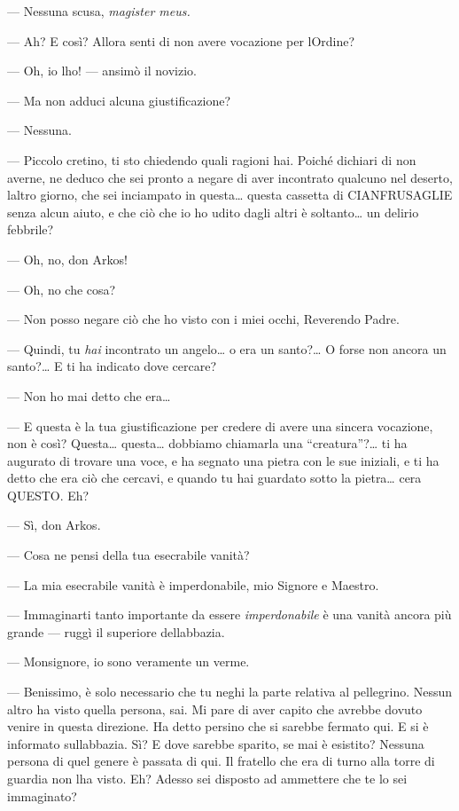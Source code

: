 --- Nessuna scusa, \emph{magister meus.}

--- Ah? E così? Allora senti di non avere vocazione per
l\textquotesingle Ordine?

--- Oh, io l\textquotesingle ho! --- ansimò il novizio.

--- Ma non adduci alcuna giustificazione?

--- Nessuna.

--- Piccolo cretino, ti sto chiedendo quali ragioni hai. Poiché dichiari
di non averne, ne deduco che sei pronto a negare di aver incontrato
qualcuno nel deserto, l\textquotesingle altro giorno, che sei inciampato
in questa\ldots{} questa cassetta di CIANFRUSAGLIE senza alcun aiuto, e
che ciò che io ho udito dagli altri è soltanto\ldots{} un delirio
febbrile?

--- Oh, no, don Arkos!

--- Oh, no che cosa?

--- Non posso negare ciò che ho visto con i miei occhi, Reverendo Padre.

--- Quindi, tu \emph{hai} incontrato un angelo\ldots{} o era un
santo?\ldots{} O forse non ancora un santo?\ldots{} E ti ha indicato
dove cercare?

--- Non ho mai detto che era\ldots{}

--- E questa è la tua giustificazione per credere di avere una sincera
vocazione, non è così? Questa\ldots{} questa\ldots{} dobbiamo chiamarla
una ``creatura''?\ldots{} ti ha augurato di trovare una voce, e ha
segnato una pietra con le sue iniziali, e ti ha detto che era ciò che
cercavi, e quando tu hai guardato sotto la pietra\ldots{}
c\textquotesingle era QUESTO. Eh?

--- Sì, don Arkos.

--- Cosa ne pensi della tua esecrabile vanità?

--- La mia esecrabile vanità è imperdonabile, mio Signore e Maestro.

--- Immaginarti tanto importante da essere \emph{imperdonabile} è una
vanità ancora più grande --- ruggì il superiore
dell\textquotesingle abbazia.

--- Monsignore, io sono veramente un verme.

--- Benissimo, è solo necessario che tu neghi la parte relativa al
pellegrino. Nessun altro ha visto quella persona, sai. Mi pare di aver
capito che avrebbe dovuto venire in questa direzione. Ha detto persino
che si sarebbe fermato qui. E si è informato
sull\textquotesingle abbazia. Sì? E dove sarebbe sparito, se mai è
esistito? Nessuna persona di quel genere è passata di qui. Il fratello
che era di turno alla torre di guardia non l\textquotesingle ha visto.
Eh? Adesso sei disposto ad ammettere che te lo sei immaginato?


